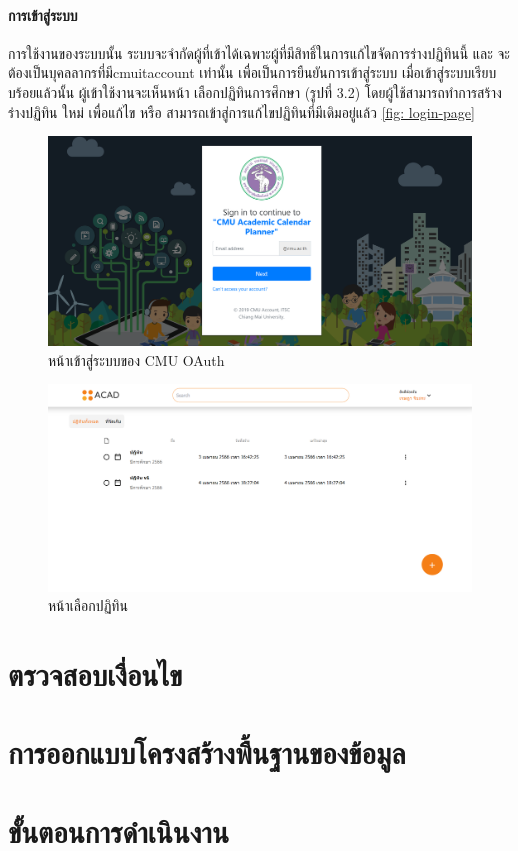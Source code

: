 \newpage
\paragraph{การเข้าสู่ระบบ}
การใช้งานของระบบนั้น ระบบจะจำกัดผู้ที่เข้าได้เฉพาะผู้ที่มีสิทธิ์ในการแก้ไขจัดการร่างปฏิทินนี้ และ จะต้องเป็นบุคลลากรที่มีcmuitaccount เท่านั้น เพื่อเป็นการยืนยันการเข้าสู่ระบบ
เมื่อเข้าสู่ระบบเรียบบร้อยแล้วนั้น ผู้เข้าใช้งานจะเห็นหน้า เลือกปฏิทินการศึกษา (รูปที่ 3.2) โดยผู้ใช้สามารถทำการสร้าง ร่างปฏิทิน ใหม่ เพื่อแก้ไข หรือ 
สามารถเข้าสู่การแก้ไขปฏิทินที่มีเดิมอยู่แล้ว
\ref*{fig: login-page}
\begin{figure}[h]
  \centering
  \includegraphics[width= 1\textwidth]{cmu-oauth.png}
  \caption{หน้าเข้าสู่ระบบของ CMU OAuth}
  \label{fig: oauth-login}
\end{figure}

\begin{figure}[h]
  \centering
  \includegraphics[width= 1\textwidth]{choose-calendar.png}
  \caption{หน้าเลือกปฏิทิน}
  \label{fig: choose-calendar-page}
\end{figure}

\section*{ตรวจสอบเงื่อนไข}

\section*{การออกแบบโครงสร้างพื้นฐานของข้อมูล}

\section*{ขั้นตอนการดําเนินงาน}





